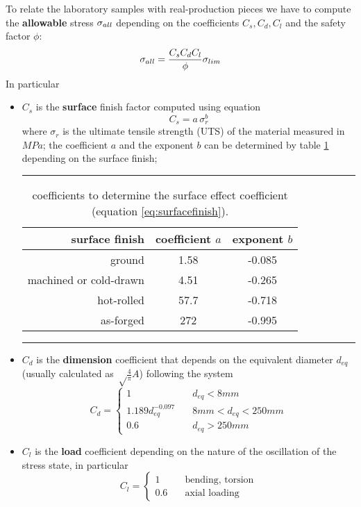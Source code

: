 	To relate the laboratory samples with real-production pieces we have to compute the \textbf{allowable} stress $\sigma_{all}$ depending on the coefficients $C_s,C_d,C_l$ and the safety factor $\phi$:
	\begin{equation}
		\sigma_{all} = \frac{C_s C_d C_l}{\phi} \sigma_{lim}
	\end{equation}
	In particular
	\begin{itemize}
		\item $C_s$ is the \textbf{surface} finish factor computed using equation \begin{equation} \label{eq:surfacefinish}
			C_s = a \,\sigma_r ^b
		\end{equation}
		where $\sigma_r$ is the ultimate tensile strength (UTS) of the material measured in $MPa$; the coefficient $a$ and the exponent $b$ can be determined by table \ref{tab:surfacefinish} depending on the surface finish;
		
		\begin{table}[bt]
			\centering
			\rule{0.8\linewidth}{1pt}
			\caption{coefficients to determine the surface effect coefficient (equation \ref{eq:surfacefinish}).}
			\label{tab:surfacefinish}
			\begin{tabular}{r | c  c}
				\textbf{surface finish} & coefficient $a$ & exponent $b$ \\ \hline
				ground & 1.58 & -0.085 \\
				machined or cold-drawn & 4.51 & -0.265 \\
				hot-rolled & 57.7 & -0.718 \\
				as-forged & 272 & -0.995
			\end{tabular}
			\rule{0.8\linewidth}{1pt}
		\end{table}
		
		
		\item $C_d$ is the \textbf{dimension} coefficient that depends on the equivalent diameter $d_{eq}$ (usually calculated as $\sqrt \frac 4 \pi A$) following the system\begin{equation} \label{eq:dimensioncoefficient}
			C_d = \begin{cases}
				1 & d_{eq} < 8mm \\
				1.189 d_{eq} ^{-0.097} \quad & 8mm < d_{eq}  < 250mm \\
				0.6 & d_{eq}  > 250mm
			\end{cases}
		\end{equation}
	
		\item $C_l$ is the \textbf{load} coefficient depending on the nature of the oscillation of the stress state, in particular
		\begin{equation}
			C_{l} = \begin{cases}
				1 & \textrm{bending, torsion} \\
				0.6 \quad & \textrm{axial loading}
			\end{cases}
		\end{equation}
	\end{itemize}


